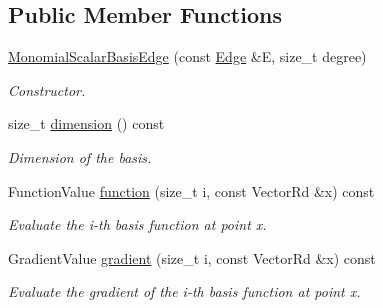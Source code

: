\subsection*{Public Member Functions}
\begin{DoxyCompactItemize}
\item 
\hyperlink{classHArDCore2D_1_1MonomialScalarBasisEdge_a1794a48fbd89584ed844950e0057f513}{Monomial\+Scalar\+Basis\+Edge} (const \hyperlink{classHArDCore2D_1_1Edge}{Edge} \&E, size\+\_\+t degree)
\begin{DoxyCompactList}\small\item\em Constructor. \end{DoxyCompactList}\item 
\mbox{\label{classHArDCore2D_1_1MonomialScalarBasisEdge_ae546ece15c11ddb4382aa47c50fdd53c}} 
size\+\_\+t \hyperlink{classHArDCore2D_1_1MonomialScalarBasisEdge_ae546ece15c11ddb4382aa47c50fdd53c}{dimension} () const
\begin{DoxyCompactList}\small\item\em Dimension of the basis. \end{DoxyCompactList}\item 
\mbox{\label{classHArDCore2D_1_1MonomialScalarBasisEdge_af3ea5893997d96a77ea5a22d80777360}} 
Function\+Value \hyperlink{classHArDCore2D_1_1MonomialScalarBasisEdge_af3ea5893997d96a77ea5a22d80777360}{function} (size\+\_\+t i, const Vector\+Rd \&x) const
\begin{DoxyCompactList}\small\item\em Evaluate the i-\/th basis function at point x. \end{DoxyCompactList}\item 
\mbox{\label{classHArDCore2D_1_1MonomialScalarBasisEdge_a46fbc56b645a745e1ffef6995decc5cd}} 
Gradient\+Value \hyperlink{classHArDCore2D_1_1MonomialScalarBasisEdge_a46fbc56b645a745e1ffef6995decc5cd}{gradient} (size\+\_\+t i, const Vector\+Rd \&x) const
\begin{DoxyCompactList}\small\item\em Evaluate the gradient of the i-\/th basis function at point x. \end{DoxyCompactList}\end{DoxyCompactItemize}
